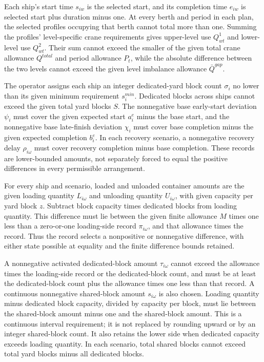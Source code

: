 \documentclass[10pt]{article}
\begin{document}
Each ship's start time $s_{iw}$ is the selected start, and its completion time $e_{iw}$ is selected start plus duration minus one. At every berth and period in each plan, the selected profiles occupying that berth cannot total more than one. Summing the profiles' level-specific crane requirements gives upper-level use $Q^1_{wt}$ and lower-level use $Q^2_{wt}$. Their sum cannot exceed the smaller of the given total crane allowance $Q^{total}$ and period allowance $P_t$, while the absolute difference between the two levels cannot exceed the given level imbalance allowance $\bar Q^{gap}$.

The operator assigns each ship an integer dedicated-yard block count $\sigma_i$ no lower than its given minimum requirement $s_i^{min}$. Dedicated blocks across ships cannot exceed the given total yard blocks $S$. The nonnegative base early-start deviation $\psi_i$ must cover the given expected start $a_i^e$ minus the base start, and the nonnegative base late-finish deviation $\chi_i$ must cover base completion minus the given expected completion $b_i^e$. In each recovery scenario, a nonnegative recovery delay $\rho_{i\omega}$ must cover recovery completion minus base completion. These records are lower-bounded amounts, not separately forced to equal the positive differences in every permissible arrangement.

For every ship and scenario, loaded and unloaded container amounts are the given loading quantity $L_{i\omega}$ and unloading quantity $U_{i\omega}$, with given capacity per yard block $z$. Subtract block capacity times dedicated blocks from loading quantity. This difference must lie between the given finite allowance $M$ times one less than a zero-or-one loading-side record $\pi_{i\omega}$, and that allowance times the record. Thus the record selects a nonpositive or nonnegative difference, with either state possible at equality and the finite difference bounds retained.

A nonnegative activated dedicated-block amount $\tau_{i\omega}$ cannot exceed the allowance times the loading-side record or the dedicated-block count, and must be at least the dedicated-block count plus the allowance times one less than that record. A continuous nonnegative shared-block amount $s_{i\omega}$ is also chosen. Loading quantity minus dedicated block capacity, divided by capacity per block, must lie between the shared-block amount minus one and the shared-block amount. This is a continuous interval requirement; it is not replaced by rounding upward or by an integer shared-block count. It also retains the lower side when dedicated capacity exceeds loading quantity. In each scenario, total shared blocks cannot exceed total yard blocks minus all dedicated blocks.
\end{document}
